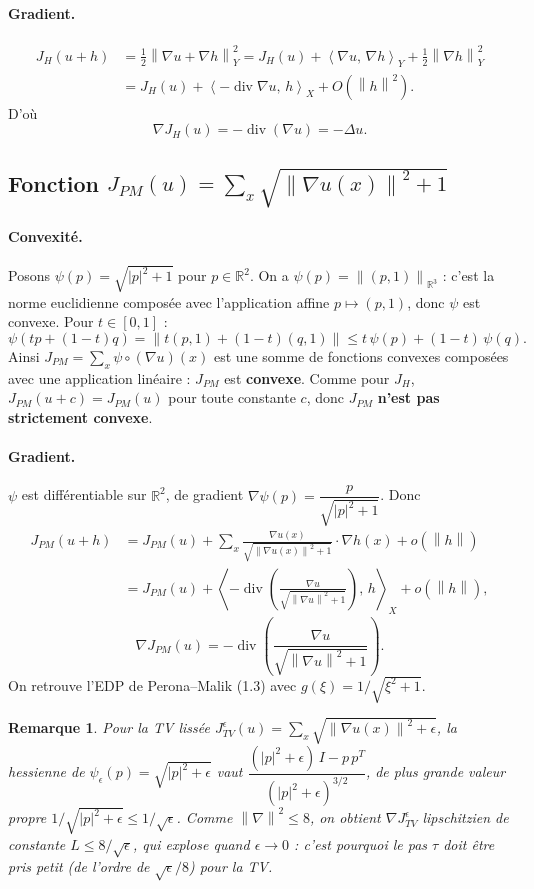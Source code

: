 \documentclass[11pt,a4paper]{article}
\newcommand{\R}{\mathbb{R}}
\newcommand{\X}{X}
\newcommand{\Y}{Y}
\newcommand{\ps}[2]{\left\langle #1,\, #2 \right\rangle}
\newcommand{\nr}[1]{\left\| #1 \right\|}
\newcommand{\dive}{\operatorname{div}}
\newtheorem*{remarque}{Remarque}
\begin{document}
\paragraph{Gradient.}
\begin{align*}
  J_H(u+h) &= \tfrac12\nr{\nabla u + \nabla h}_\Y^2
  = J_H(u) + \ps{\nabla u}{\nabla h}_\Y + \tfrac12\nr{\nabla h}_\Y^2 \\
  &= J_H(u) + \ps{-\dive \nabla u}{h}_\X + O(\nr{h}^2).
\end{align*}
D'où
\[
  \boxed{\nabla J_H(u) = -\dive(\nabla u) = -\Delta u.}
\]

\subsection*{Fonction $J_{PM}(u) = \sum_{x} \sqrt{\nr{\nabla u(x)}^2 + 1}$}

\paragraph{Convexité.}
Posons $\psi(p) = \sqrt{|p|^2 + 1}$ pour $p\in\R^2$. On a $\psi(p) = \nr{(p,1)}_{\R^3}$ : c'est la norme
euclidienne composée avec l'application affine $p\mapsto(p,1)$, donc $\psi$ est convexe.
Pour $t\in[0,1]$ :
\[
  \psi(tp+(1-t)q) = \nr{t(p,1) + (1-t)(q,1)} \le t\,\psi(p) + (1-t)\,\psi(q).
\]
Ainsi $J_{PM} = \sum_x \psi\circ(\nabla u)(x)$ est une somme de fonctions convexes composées avec une application
linéaire : $J_{PM}$ est \textbf{convexe}. Comme pour $J_H$, $J_{PM}(u+c) = J_{PM}(u)$ pour toute constante $c$,
donc $J_{PM}$ \textbf{n'est pas strictement convexe}.

\paragraph{Gradient.}
$\psi$ est différentiable sur $\R^2$, de gradient $\nabla\psi(p) = \dfrac{p}{\sqrt{|p|^2+1}}$. Donc
\begin{align*}
  J_{PM}(u+h) &= J_{PM}(u) + \sum_x \frac{\nabla u(x)}{\sqrt{\nr{\nabla u(x)}^2+1}}\cdot \nabla h(x) + o(\nr{h}) \\
  &= J_{PM}(u) + \ps{-\dive\!\left(\frac{\nabla u}{\sqrt{\nr{\nabla u}^2+1}}\right)}{h}_\X + o(\nr{h}),
\end{align*}
\[
  \boxed{\nabla J_{PM}(u) = -\dive\!\left(\frac{\nabla u}{\sqrt{\nr{\nabla u}^2+1}}\right).}
\]
On retrouve l'EDP de Perona--Malik (1.3) avec $g(\xi) = 1/\sqrt{\xi^2+1}$.

\begin{remarque}
Pour la TV lissée $J^{\epsilon}_{TV}(u) = \sum_x \sqrt{\nr{\nabla u(x)}^2+\epsilon}$, la hessienne de
$\psi_\epsilon(p)=\sqrt{|p|^2+\epsilon}$ vaut
$\dfrac{(|p|^2+\epsilon)\,I - p\,p^{T}}{(|p|^2+\epsilon)^{3/2}}$, de plus grande valeur propre
$1/\sqrt{|p|^2+\epsilon} \le 1/\sqrt{\epsilon}$. Comme $\nr{\nabla}^2 \le 8$, on obtient
$\nabla J^{\epsilon}_{TV}$ lipschitzien de constante $L \le 8/\sqrt{\epsilon}$, qui explose quand $\epsilon\to 0$ :
c'est pourquoi le pas $\tau$ doit être pris petit (de l'ordre de $\sqrt{\epsilon}/8$) pour la TV.
\end{remarque}
\end{document}
